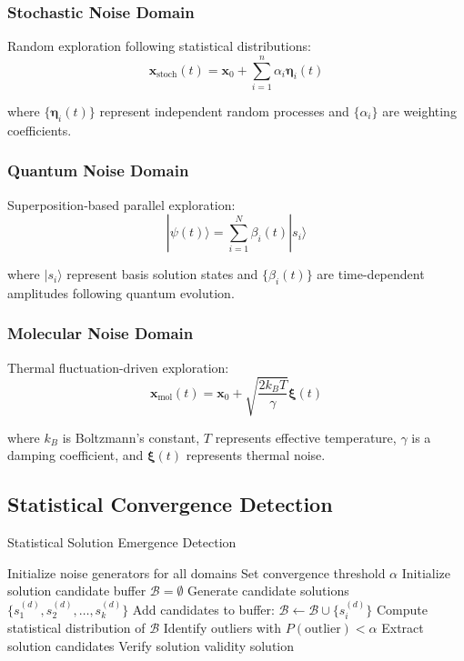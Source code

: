 \documentclass[11pt,a4paper]{article}
\theoremstyle{remark}
\begin{document}
\subsubsection{Stochastic Noise Domain}

Random exploration following statistical distributions:
$$\mathbf{x}_{\text{stoch}}(t) = \mathbf{x}_0 + \sum_{i=1}^n \alpha_i \boldsymbol{\eta}_i(t)$$

where $\{\boldsymbol{\eta}_i(t)\}$ represent independent random processes and $\{\alpha_i\}$ are weighting coefficients.

\subsubsection{Quantum Noise Domain}

Superposition-based parallel exploration:
$$|\psi(t)\rangle = \sum_{i=1}^N \beta_i(t) |s_i\rangle$$

where $|s_i\rangle$ represent basis solution states and $\{\beta_i(t)\}$ are time-dependent amplitudes following quantum evolution.

\subsubsection{Molecular Noise Domain}

Thermal fluctuation-driven exploration:
$$\mathbf{x}_{\text{mol}}(t) = \mathbf{x}_0 + \sqrt{\frac{2k_B T}{\gamma}} \boldsymbol{\xi}(t)$$

where $k_B$ is Boltzmann's constant, $T$ represents effective temperature, $\gamma$ is a damping coefficient, and $\boldsymbol{\xi}(t)$ represents thermal noise.

\subsection{Statistical Convergence Detection}

\begin{algorithm}
\caption{Statistical Solution Emergence Detection}
\begin{algorithmic}[1]
\State Initialize noise generators for all domains
\State Set convergence threshold $\alpha$
\State Initialize solution candidate buffer $\mathcal{B} = \emptyset$
        \State Generate candidate solutions $\{s_1^{(d)}, s_2^{(d)}, \ldots, s_k^{(d)}\}$
        \State Add candidates to buffer: $\mathcal{B} \leftarrow \mathcal{B} \cup \{s_i^{(d)}\}$
    \EndFor
    \State Compute statistical distribution of $\mathcal{B}$
    \State Identify outliers with $P(\text{outlier}) < \alpha$
        \State Extract solution candidates
        \State Verify solution validity
            \Return solution
        \EndIf
    \EndIf
\EndWhile
\end{algorithmic}
\end{algorithm}
\end{document}
